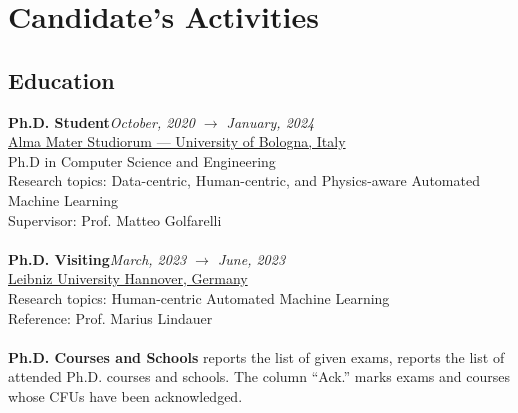 \section*{Candidate's Activities}

\subsection*{Education}

\textbf{Ph.D. Student}\hfill \textit{October, 2020 $\rightarrow$ January, 2024}\\
\underline{Alma Mater Studiorum --- University of Bologna, Italy}\\
Ph.D in Computer Science and Engineering\\
Research topics: Data-centric, Human-centric, and Physics-aware Automated Machine Learning\\
Supervisor: Prof. Matteo Golfarelli\\
\\
\textbf{Ph.D. Visiting}\hfill \textit{March, 2023 $\rightarrow$ June, 2023}\\
\underline{Leibniz University Hannover, Germany}\\
Research topics: Human-centric Automated Machine Learning\\
Reference: Prof. Marius Lindauer\\
\\
\textbf{Ph.D. Courses and Schools}
 reports the list of given exams,  reports the list of attended Ph.D. courses and schools.
The column ``Ack.'' marks exams and courses whose CFUs  have been acknowledged.
\renewcommand{\arraystretch}{1.3}
